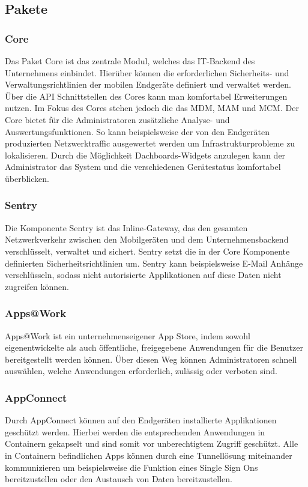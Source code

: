 \subsection {Pakete}
\subsubsection {Core}
Das Paket Core ist das zentrale Modul, welches das IT-Backend des Unternehmens einbindet. Hierüber können die erforderlichen Sicherheits- und Verwaltungsrichtlinien der mobilen Endgeräte definiert und verwaltet werden. Über die  API Schnittstellen des Cores kann man komfortabel Erweiterungen nutzen. Im Fokus des Cores stehen jedoch die das MDM, MAM und MCM. Der Core bietet für die Administratoren zusätzliche Analyse- und Auswertungsfunktionen. So kann beispielsweise der von den Endgeräten produzierten Netzwerktraffic ausgewertet werden um Infrastrukturprobleme zu lokalisieren. Durch die Möglichkeit Dachboards-Widgets anzulegen kann der Administrator das System und die verschiedenen Gerätestatus komfortabel überblicken. 
\subsubsection {Sentry}
Die Komponente Sentry ist das Inline-Gateway, das den gesamten Netzwerkverkehr zwischen den Mobilgeräten und dem Unternehmensbackend verschlüsselt, verwaltet und sichert. Sentry setzt die in der Core Komponente definierten Sicherheitsrichtlinien um. Sentry kann beispielsweise E-Mail Anhänge verschlüsseln, sodass nicht autorisierte Applikationen auf diese Daten nicht zugreifen können. 

\subsubsection {Apps@Work}
Apps@Work ist ein unternehmenseigener App Store, indem sowohl eigenentwickelte als auch öffentliche, freigegebene Anwendungen für die Benutzer bereitgestellt werden können. Über diesen Weg können Administratoren schnell auswählen, welche Anwendungen erforderlich, zulässig oder verboten sind. 
\subsubsection {AppConnect}
Durch AppConnect können auf den Endgeräten installierte Applikationen geschützt werden. Hierbei werden die entsprechenden Anwendungen in Containern gekapselt und sind somit vor unberechtigtem Zugriff geschützt. Alle in Containern befindlichen Apps können durch eine Tunnellösung miteinander kommunizieren um beispielsweise die Funktion eines Single Sign Ons bereitzustellen oder den Austausch von Daten bereitzustellen. 
